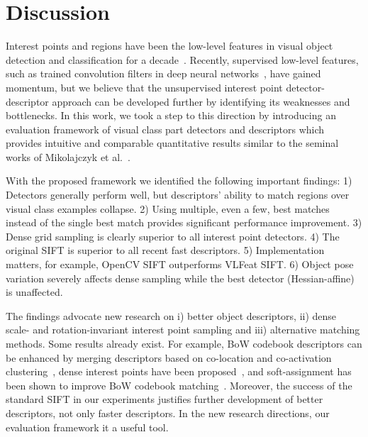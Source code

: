 \documentclass[journal]{IEEEtran}
\begin{document}


%
\section{Discussion}
%
Interest points and regions have been the low-level features in
visual object detection and classification for a decade~\cite{SivZis:2003}.
Recently, supervised low-level features, such as trained
convolution filters in deep neural
networks~\cite{KriSutHin:2012}, have gained momentum, but we
believe that the unsupervised interest point detector-descriptor
approach can be developed further by identifying its weaknesses and
bottlenecks.
In this work, we took a step to this direction by introducing
an evaluation framework of visual
class part detectors and descriptors which provides intuitive
and comparable quantitative results similar to the seminal works
of Mikolajczyk et al.~\cite{MikTuySch:2005,MikSch:2005}.

With the proposed framework we identified the following
important findings:
1) Detectors generally perform well, but descriptors' ability to match
regions over visual class examples collapse.
2) Using multiple, even a few, best matches instead of the single best match
provides significant performance improvement.
3) Dense grid sampling is clearly superior to all interest point detectors.
4) The original SIFT is superior to all recent fast descriptors.
5) Implementation matters, for example, OpenCV SIFT outperforms VLFeat SIFT.
6) Object pose variation severely affects dense sampling
while the best detector (Hessian-affine) is unaffected.

The findings advocate new research on i) better
object descriptors,
ii) dense scale- and rotation-invariant interest point sampling and iii)
alternative matching methods. Some results already exist.
For example, BoW codebook descriptors can be enhanced by merging
descriptors based on co-location and co-activation
clustering~\cite{LeiEttSch:2008}, dense interest points have
been proposed~\cite{Tuy:2010}, and soft-assignment has been shown
to improve BoW codebook matching~\cite{AgaTri:2008}.
Moreover, the success of the standard SIFT in our experiments
justifies further development of better descriptors, not only
faster descriptors. In the new research directions, our evaluation
framework it a useful tool.
\end{document}
